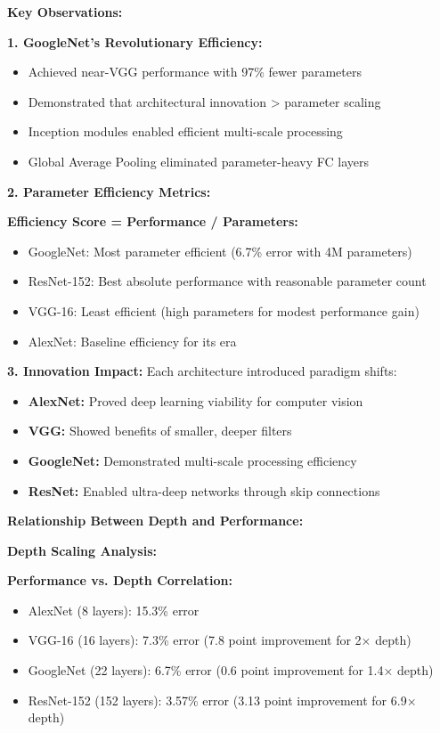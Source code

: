 \documentclass[12pt]{article}
\begin{document}
\begin{enumerate}[(a)]
{    \textbf{Key Observations:}
    
    \textbf{1. GoogleNet's Revolutionary Efficiency:}
    \begin{itemize}
        \item Achieved near-VGG performance with 97\% fewer parameters
        \item Demonstrated that architectural innovation > parameter scaling
        \item Inception modules enabled efficient multi-scale processing
        \item Global Average Pooling eliminated parameter-heavy FC layers
    \end{itemize}
    
    \textbf{2. Parameter Efficiency Metrics:}
    
    \textbf{Efficiency Score = Performance / Parameters:}
    \begin{itemize}
        \item GoogleNet: Most parameter efficient (6.7\% error with 4M parameters)
        \item ResNet-152: Best absolute performance with reasonable parameter count
        \item VGG-16: Least efficient (high parameters for modest performance gain)
        \item AlexNet: Baseline efficiency for its era
    \end{itemize}
    
    \textbf{3. Innovation Impact:}
    Each architecture introduced paradigm shifts:
    \begin{itemize}
        \item \textbf{AlexNet:} Proved deep learning viability for computer vision
        \item \textbf{VGG:} Showed benefits of smaller, deeper filters
        \item \textbf{GoogleNet:} Demonstrated multi-scale processing efficiency
        \item \textbf{ResNet:} Enabled ultra-deep networks through skip connections
    \end{itemize}
    
    \textbf{Relationship Between Depth and Performance:}
    
    \textbf{Depth Scaling Analysis:}
    
    \textbf{Performance vs. Depth Correlation:}
    \begin{itemize}
        \item AlexNet (8 layers): 15.3\% error
        \item VGG-16 (16 layers): 7.3\% error (7.8 point improvement for 2× depth)
        \item GoogleNet (22 layers): 6.7\% error (0.6 point improvement for 1.4× depth)
        \item ResNet-152 (152 layers): 3.57\% error (3.13 point improvement for 6.9× depth)
    \end{itemize}
    
}
\end{enumerate}
\end{document}
